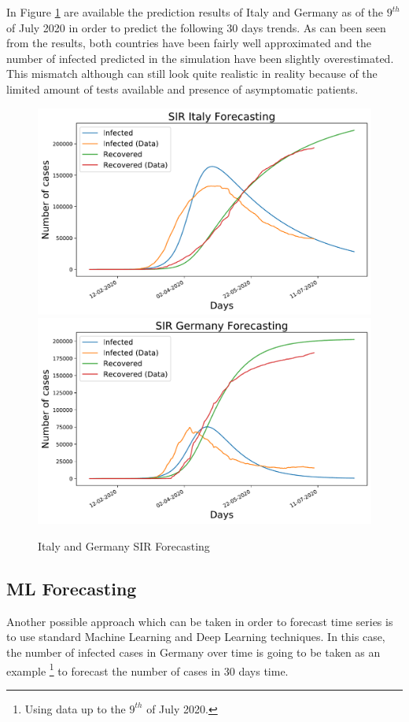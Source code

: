 In Figure \ref{sir_forecast} are available the prediction results of Italy and Germany as of the $9^{th}$ of July 2020 in order to predict the following 30 days trends. As can been seen from the results, both countries have been fairly well approximated and the number of infected predicted in the simulation have been slightly overestimated. This mismatch although can still look quite realistic in reality because of the limited amount of tests available and presence of asymptomatic patients.

\begin{figure}[ht!]%
    \centering
    \includegraphics[width=0.49\linewidth]{latex/images/Italy_preds.pdf}
    \includegraphics[width=0.49\linewidth]{latex/images/Germany_preds.pdf}
    \vspace{-0.2cm}
    \caption{Italy and Germany SIR Forecasting}
    \label{sir_forecast}
\end{figure}

\subsection{ML Forecasting}

Another possible approach which can be taken in order to forecast time series is to use standard Machine Learning and Deep Learning techniques. In this case, the number of infected cases in Germany over time is going to be taken as an example \footnote{Using data up to the $9^{th}$ of July 2020.} to forecast the number of cases in 30 days time. 

